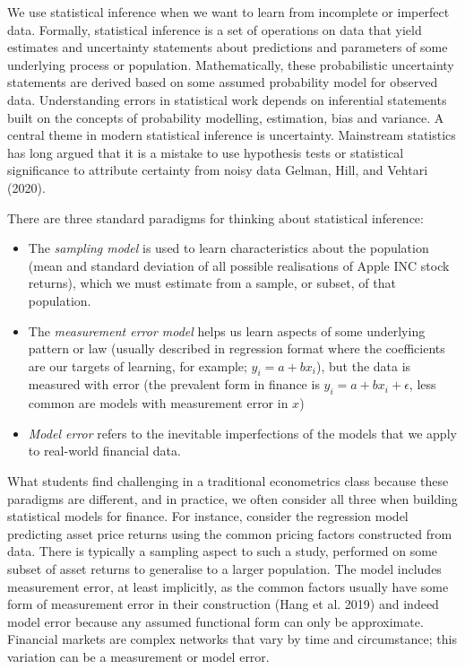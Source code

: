 \documentclass{article}
\begin{document}
We use statistical inference when we want to learn from incomplete or
imperfect data. Formally, statistical inference is a set of operations
on data that yield estimates and uncertainty statements about
predictions and parameters of some underlying process or population.
Mathematically, these probabilistic uncertainty statements are derived
based on some assumed probability model for observed data. Understanding
errors in statistical work depends on inferential statements built on
the concepts of probability modelling, estimation, bias and variance. A
central theme in modern statistical inference is uncertainty. Mainstream
statistics has long argued that it is a mistake to use hypothesis tests
or statistical significance to attribute certainty from noisy data
Gelman, Hill, and Vehtari (2020).

There are three standard paradigms for thinking about statistical
inference:

\begin{itemize}
\tightlist
\item
  The \emph{sampling model} is used to learn characteristics about the
  population (mean and standard deviation of all possible realisations
  of Apple INC stock returns), which we must estimate from a sample, or
  subset, of that population.
\item
  The \emph{measurement error model} helps us learn aspects of some
  underlying pattern or law (usually described in regression format
  where the coefficients are our targets of learning, for example;
  \(y_i=a+bx_i\)), but the data is measured with error (the prevalent
  form in finance is \(y_i=a+bx_i+\epsilon\), less common are models
  with measurement error in \(x\))
\item
  \emph{Model error} refers to the inevitable imperfections of the
  models that we apply to real-world financial data.
\end{itemize}

What students find challenging in a traditional econometrics class
because these paradigms are different, and in practice, we often
consider all three when building statistical models for finance. For
instance, consider the regression model predicting asset price returns
using the common pricing factors constructed from data. There is
typically a sampling aspect to such a study, performed on some subset of
asset returns to generalise to a larger population. The model includes
measurement error, at least implicitly, as the common factors usually
have some form of measurement error in their construction (Hang et al.
2019) and indeed model error because any assumed functional form can
only be approximate. Financial markets are complex networks that vary by
time and circumstance; this variation can be a measurement or model
error.
\end{document}
